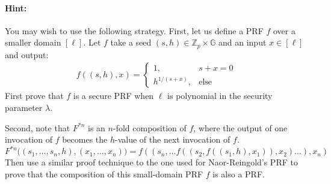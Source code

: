 \documentclass[11pt]{article}
\newenvironment{solution}{\color{blue}\noindent{\bf Solution}\hspace*{1em}}{\qed\medskip}
\newcommand{\qed}{\mbox{}\hspace*{\fill}\nolinebreak\mbox{$\rule{0.6em}{0.6em}$}} %
\numberwithin{equation}{section}
\newcommand{\bbG}{\mathbb{G}}
\newcommand{\bbZ}{\mathbb{Z}}
\newif\ifsol
\begin{document}
\paragraph{Hint:} You may wish to use the following strategy. First, let us define a PRF $f$ over a smaller domain $[\ell]$. Let $f$ take a seed $(s,h) \in \bbZ_p \times \bbG$ and an input $x \in [\ell]$ and output:
\begin{align*}
    f((s, h),x) = 
    \begin{cases}
        1, & s+x = 0\\
        h^{1/(s+x)}, &\text{else}
    \end{cases}
\end{align*}
First prove that $f$ is a secure PRF when $\ell$ is polynomial in the security parameter $\lambda$.

Second, note that $F^{*n}$ is an $n$-fold composition of $f$, where the output of one invocation of $f$ becomes the $h$-value of the next invocation of $f$.
\[F^{*n}\big((s_1, \dots, s_n, h), (x_1, \dots, x_n)\big) = f((s_n, \dots f((s_2, f((s_1, h), x_1)), x_2) \dots), x_n)\]
Then use a similar proof technique to the one used for Naor-Reingold's PRF to prove that the composition of this small-domain PRF $f$ is also a PRF.

\ifsol
\pagebreak
\begin{solution}
TBD
\end{solution}
\fi
\end{document}
